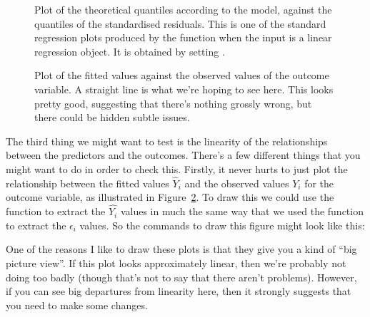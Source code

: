 \begin{figure}[t]
\begin{center}
\caption{Plot of the theoretical quantiles according to the model, against the quantiles of the standardised residuals. This is one of the standard regression plots produced by the  function when the input is a linear regression object. It is obtained by setting . }
\HR
\label{fig:regressionplot2}
\end{center}
\end{figure}




\begin{figure}[t]
\begin{center}
\caption{Plot of the fitted values against the observed values of the outcome variable. A straight line is what we're hoping to see here. This looks pretty good, suggesting that there's nothing grossly wrong, but there could be hidden subtle issues. }
\label{fig:regressionlinearity}
\HR
\end{center}
\end{figure}

The third thing we might want to test is the linearity of the relationships between the predictors and the outcomes. There's a few different things that you might want to do in order to check this. Firstly, it never hurts to just plot the relationship between the fitted values $\hat{Y}_i$ and the observed values $Y_i$ for the outcome variable, as illustrated in Figure~\ref{fig:regressionlinearity}. To draw this we could use the  function to extract the $\hat{Y_i}$ values in much the same way that we used the  function to extract the $\epsilon_i$ values. So the commands to draw this figure might look like this:
One of the reasons I like to draw these plots is that they give you a kind of ``big picture view''. If this plot looks approximately linear, then we're probably not doing too badly (though that's not to say that there aren't problems). However, if you can see big departures from linearity here, then it strongly suggests that you need to make some changes.

